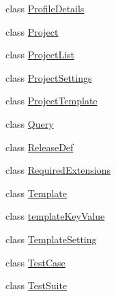 \begin{DoxyCompactItemize}
class \mbox{\hyperlink{class_vsts_demo_builder_1_1_models_1_1_profile_details}{Profile\+Details}}
\item 
class \mbox{\hyperlink{class_vsts_demo_builder_1_1_models_1_1_project}{Project}}
\item 
class \mbox{\hyperlink{class_vsts_demo_builder_1_1_models_1_1_project_list}{Project\+List}}
\item 
class \mbox{\hyperlink{class_vsts_demo_builder_1_1_models_1_1_project_settings}{Project\+Settings}}
\item 
class \mbox{\hyperlink{class_vsts_demo_builder_1_1_models_1_1_project_template}{Project\+Template}}
\item 
class \mbox{\hyperlink{class_vsts_demo_builder_1_1_models_1_1_query}{Query}}
\item 
class \mbox{\hyperlink{class_vsts_demo_builder_1_1_models_1_1_release_def}{Release\+Def}}
\item 
class \mbox{\hyperlink{class_vsts_demo_builder_1_1_models_1_1_required_extensions}{Required\+Extensions}}
\item 
class \mbox{\hyperlink{class_vsts_demo_builder_1_1_models_1_1_template}{Template}}
\item 
class \mbox{\hyperlink{class_vsts_demo_builder_1_1_models_1_1template_key_value}{template\+Key\+Value}}
\item 
class \mbox{\hyperlink{class_vsts_demo_builder_1_1_models_1_1_template_setting}{Template\+Setting}}
\item 
class \mbox{\hyperlink{class_vsts_demo_builder_1_1_models_1_1_test_case}{Test\+Case}}
\item 
class \mbox{\hyperlink{class_vsts_demo_builder_1_1_models_1_1_test_suite}{Test\+Suite}}
\end{DoxyCompactItemize}
